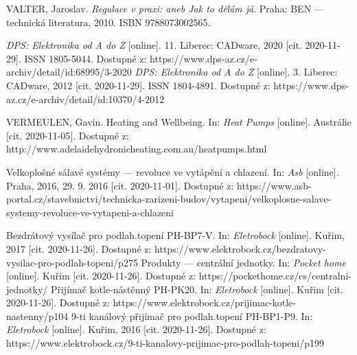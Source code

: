\begin{thebibliography}{3}
VALTER, Jaroslav. \textit{Regulace v praxi: aneb Jak to dělám já}. Praha: BEN --- technická literatura, 2010. ISBN 9788073002565.

\textit{DPS: Elektronika od A do Z} [online]. 11. Liberec: CADware, 2020 [cit. 2020-11-29]. ISSN 1805-5044. Dostupné z: https://www.dps-az.cz/e-archiv/detail/id:68995/3-2020
\textit{DPS: Elektronika od A do Z} [online]. 3. Liberec: CADware, 2012 [cit. 2020-11-29]. ISSN 1804-4891. Dostupné z: https://www.dps-az.cz/e-archiv/detail/id:10370/4-2012


VERMEULEN, Gavin. Heating and Wellbeing. In: \textit{Heat Pumps} [online]. Austrálie [cit. 2020-11-05]. Dostupné z: http://www.adelaidehydronicheating.com.au/heatpumps.html

Velkoplošné sálavé systémy --- revoluce ve vytápění a chlazení. In: \textit{Asb} [online]. Praha, 2016, 29. 9. 2016 [cit. 2020-11-01]. Dostupné z: https://www.asb-portal.cz/stavebnictvi/technicka-zarizeni-budov/vytapeni/velkoplosne-salave-systemy-revoluce-ve-vytapeni-a-chlazeni

Bezdrátový vysílač pro podlah.topení PH-BP7-V. In: \textit{Eletrobock} [online]. Kuřim, 2017 [cit. 2020-11-26]. Dostupné z: https://www.elektrobock.cz/bezdratovy-vysilac-pro-podlah-topeni/p275
Produkty --- centrální jednotky. In: \textit{Pocket home} [online]. Kuřim [cit. 2020-11-26]. Dostupné z: https://pockethome.cz/cs/centralni-jednotky/
Přijímač kotle-nástěnný PH-PK20. In: \textit{Eletrobock} [online]. Kuřim [cit. 2020-11-26]. Dostupné z: https://www.elektrobock.cz/prijimac-kotle-nastenny/p104
9-ti kanálový přijímač pro podlah.topení PH-BP1-P9. In: \textit{Eletrobock} [online]. Kuřim, 2016 [cit. 2020-11-26]. Dostupné z: https://www.elektrobock.cz/9-ti-kanalovy-prijimac-pro-podlah-topeni/p199


\end{thebibliography}
